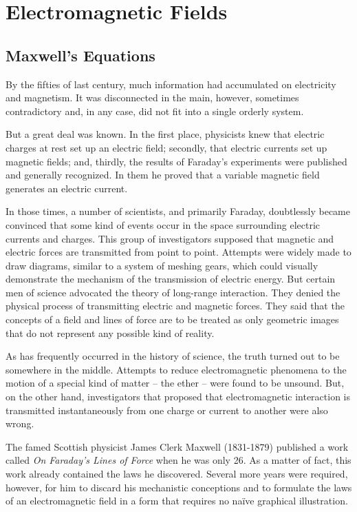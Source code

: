 

\cleardoublepage
\chapter{Electromagnetic Fields}
\label{ch-05}

\section{Maxwell's Equations}
By the fifties of last century, much information had accumulated on electricity and magnetism. It was disconnected in the main, however, sometimes contradictory and, in any case, did not fit into a single orderly system.


But a great deal was known. In the first place, physicists knew that electric charges at rest set up an electric field; secondly, that electric currents set up magnetic fields; and, thirdly, the results of Faraday's experiments were published and generally recognized. In them he proved that a variable magnetic field generates an electric current.

In those times, a number of scientists, and primarily Faraday, doubtlessly became convinced that some kind of events occur in the space surrounding electric currents and charges. This group of investigators supposed that magnetic and electric forces are transmitted from point to point. Attempts were widely made to draw diagrams, similar to a system of meshing gears, which could visually demonstrate the mechanism of the transmission of electric energy. But certain men of science advocated the theory of long-range interaction. They denied the physical process of transmitting electric and magnetic forces. They said that the concepts of a field and lines of force are to be treated as only geometric images that do not represent any possible kind of reality.

As has frequently occurred in the history of science, the truth turned out to be somewhere in the middle. Attempts to reduce electromagnetic phenomena to the motion of a special kind of matter -- the ether -- were found to be unsound. But, on the other hand, investigators that proposed that electromagnetic interaction is transmitted instantaneously from one charge or current to another were also wrong.

The famed Scottish physicist James Clerk Maxwell (1831-1879) published a work called \emph{On Faraday's Lines of Force} when he was only 26. As a matter of fact, this work already contained the laws he discovered. Several more years were required, however, for him to discard his mechanistic conceptions and to formulate the laws of an electromagnetic field in a form that requires no na\"ive graphical illustration.

